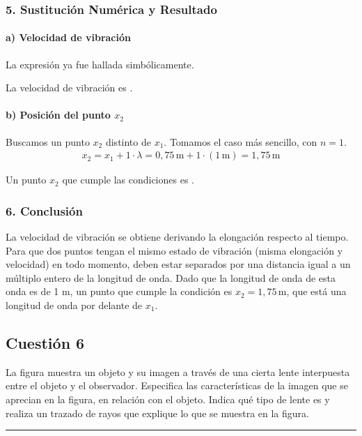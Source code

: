 \subsubsection*{5. Sustitución Numérica y Resultado}
\paragraph*{a) Velocidad de vibración}
La expresión ya fue hallada simbólicamente.
\begin{cajaresultado}
    La velocidad de vibración es .
\end{cajaresultado}

\paragraph*{b) Posición del punto $x_2$}
Buscamos un punto $x_2$ distinto de $x_1$. Tomamos el caso más sencillo, con $n=1$.
\begin{gather}
    x_2 = x_1 + 1 \cdot \lambda = 0,75 \, \text{m} + 1 \cdot (1 \, \text{m}) = 1,75 \, \text{m}
\end{gather}
\begin{cajaresultado}
    Un punto $x_2$ que cumple las condiciones es .
\end{cajaresultado}

\subsubsection*{6. Conclusión}
\begin{cajaconclusion}
La velocidad de vibración se obtiene derivando la elongación respecto al tiempo. Para que dos puntos tengan el mismo estado de vibración (misma elongación y velocidad) en todo momento, deben estar separados por una distancia igual a un múltiplo entero de la longitud de onda. Dado que la longitud de onda de esta onda es de 1 m, un punto que cumple la condición es $x_2=1,75\,\text{m}$, que está una longitud de onda por delante de $x_1$.
\end{cajaconclusion}
\newpage

\subsection{Cuestión 6}
\label{subsec:C6_2021_jun_ord}

\begin{cajaenunciado}
La figura muestra un objeto y su imagen a través de una cierta lente interpuesta entre el objeto y el observador. Especifica las características de la imagen que se aprecian en la figura, en relación con el objeto. Indica qué tipo de lente es y realiza un trazado de rayos que explique lo que se muestra en la figura.
\end{cajaenunciado}
\hrule

